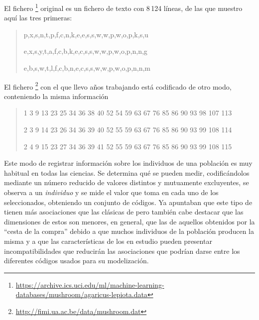 El fichero \mushroom\footnote{\scriptsize\url{https://archive.ics.uci.edu/ml/machine-learning-databases/mushroom/agaricus-lepiota.data}} original es un fichero de texto con 8\,124 líneas, de las que muestro aquí las tres primeras:
\begin{quote}
   \footnotesize
   p,x,s,n,t,p,f,c,n,k,e,e,s,s,w,w,p,w,o,p,k,s,u
   
   e,x,s,y,t,a,f,c,b,k,e,c,s,s,w,w,p,w,o,p,n,n,g
   
   e,b,s,w,t,l,f,c,b,n,e,c,s,s,w,w,p,w,o,p,n,n,m
\end{quote}

El fichero \mushroom\footnote{\scriptsize\url{http://fimi.ua.ac.be/data/mushroom.dat}} con el que llevo años trabajando está codificado de otro modo, conteniendo la misma información
\begin{quote}
   \footnotesize
   1 3 9 13 23 25 34 36 38 40 52 54 59 63 67 76 85 86 90 93 98 107 113
   
   2 3 9 14 23 26 34 36 39 40 52 55 59 63 67 76 85 86 90 93 99 108 114
   
   2 4 9 15 23 27 34 36 39 41 52 55 59 63 67 76 85 86 90 93 99 108 115
\end{quote}

Este modo de registrar información sobre los individuos de una población es muy habitual en todas las ciencias. Se determina qué \atributos se pueden medir, codificándolos mediante un número reducido de valores distintos y mutuamente excluyentes, se observa a un \emph{individuo} y se mide el valor que toma en cada uno de los \atributos seleccionados, obteniendo un conjunto de códigos. Ya apuntaban \citet{LiuHsuMa-IntegratingClassificationAndARM-1998} que este tipo de \datasets tienen más asociaciones que las clásicas \transacciones de \ARM pero también cabe destacar que las dimensiones de estos \datasets son menores, en general, que las de aquellos obtenidos por la "`cesta de la compra"' debido a que muchos individuos de la población producen la misma \transaccion y a que las características de los \atributos en estudio pueden presentar incompatibilidades que reducirán las asociaciones que podrían darse entre los diferentes códigos usados para su modelización.

